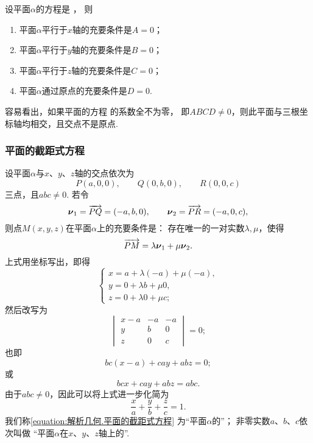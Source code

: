 \begin{corollary}
设平面\(\alpha\)的方程是 ，
则\begin{enumerate}
	\item 平面\(\alpha\)平行于\(x\)轴的充要条件是\(A=0\)；
	\item 平面\(\alpha\)平行于\(y\)轴的充要条件是\(B=0\)；
	\item 平面\(\alpha\)平行于\(z\)轴的充要条件是\(C=0\)；
	\item 平面\(\alpha\)通过原点的充要条件是\(D=0\).
\end{enumerate}
\end{corollary}

容易看出，如果平面的方程  的系数全不为零，
即\(ABCD\neq0\)，则此平面与三根坐标轴均相交，且交点不是原点.

\subsubsection{平面的截距式方程}
设平面\(\alpha\)与\(x\)、\(y\)、\(z\)轴的交点依次为\[
	P(a,0,0), \qquad
	Q(0,b,0), \qquad
	R(0,0,c)
\]三点，且\(abc\neq0\).
若令\[
	\boldsymbol{\nu}_1 = \overrightarrow{PQ} = (-a,b,0), \qquad
	\boldsymbol{\nu}_2 = \overrightarrow{PR} = (-a,0,c),
\]
则点\(M(x,y,z)\)在平面\(\alpha\)上的充要条件是：
存在唯一的一对实数\(\lambda,\mu\)，使得\[
	\overrightarrow{PM} = \lambda \boldsymbol{\nu}_1 + \mu \boldsymbol{\nu}_2.
\]
上式用坐标写出，即得\[
	\left\{ \begin{array}{l}
		x = a + \lambda (-a) + \mu(-a), \\
		y = 0 + \lambda b + \mu 0, \\
		z = 0 + \lambda 0 + \mu c;
	\end{array} \right.
\]然后改写为\[
	\begin{vmatrix}
		x-a & -a & -a \\
		y & b & 0 \\
		z & 0 & c
	\end{vmatrix} = 0;
\]也即\[
	bc (x-a) + ca y + ab z = 0;
\]或\[
	bc x + ca y + ab z = abc.
\]
由于\(abc\neq0\)，因此可以将上式进一步化简为
\begin{equation}\label{equation:解析几何.平面的截距式方程}
	\frac{x}{a} + \frac{y}{b} + \frac{z}{c} = 1.
\end{equation}
我们称\cref{equation:解析几何.平面的截距式方程}
为“平面\(\alpha\)的”；
非零实数\(a\)、\(b\)、\(c\)依次叫做
“平面\(\alpha\)在\(x\)、\(y\)、\(z\)轴上的”.

